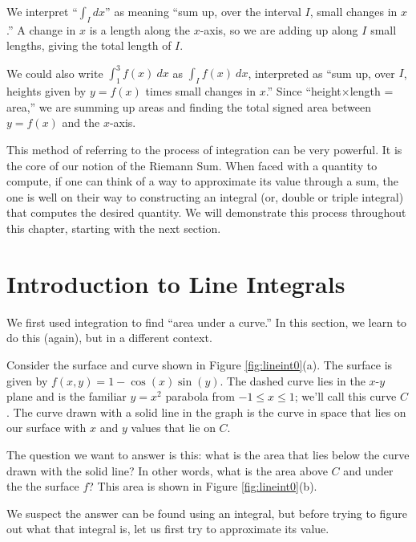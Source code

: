 We interpret ``$\int_I dx$'' as meaning ``sum up, over the interval $I$, small changes in $x$.'' A change in $x$ is a length along the $x$-axis, so we are adding up along $I$ small lengths, giving the total length of $I$. 

We could also write $\int_1^3f(x)\ dx$ as $\int_I f(x)\ dx$, interpreted as ``sum up, over $I$, heights given by $y = f(x)$ times small changes in $x$.'' Since ``height$\times$length = area,'' we are summing up areas and finding the total signed area between $y = f(x)$ and the $x$-axis. 

This method of referring to the process of integration can be very powerful. It is the core of our notion of the Riemann Sum. When faced with a quantity to compute, if one can think of a way to approximate its value through a sum, the one is well on their way to constructing an integral (or, double or triple integral) that computes the desired quantity. We will demonstrate this process throughout this chapter, starting with the next section.

\section{Introduction to Line Integrals}\label{sec:line_int_intro}
We first used integration to find ``area under a curve.'' In this section, we learn to do this (again), but in a different context.

Consider the surface and curve shown in Figure \ref{fig:lineint0}(a). The surface is given by $f(x,y)=1-\cos(x)\sin(y)$. The dashed curve lies in the $x$-$y$ plane and is the familiar $y=x^2$ parabola from $-1\leq x\leq1$; we'll call this curve $C$. The curve drawn with a solid line in the graph is the curve in space that lies on our surface with $x$ and $y$ values that lie on $C$. 

The question we want to answer is this: what is the area that lies below the curve drawn with the solid line? In other words, what is the area above $C$ and under the the surface $f$? This area is shown in Figure \ref{fig:lineint0}(b).

We suspect the answer can be found using an integral, but before trying to figure out what that integral is, let us first try to approximate its value. 

